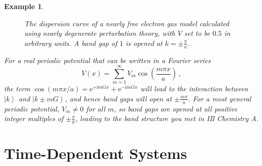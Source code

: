 \documentclass{article}
\theoremstyle{plain}\theoremheaderfont{\normalfont\itshape}\theorembodyfont{\rmfamily}\theoremseparator{.}\newtheorem*{rem}{Remark}\newtheorem*{ex}{Example}\newtheorem*{proof}{Proof}\newtheorem*{altp}{Alternative proof}
\theoremstyle{plain}\theoremheaderfont{\normalfont\bfseries}\theorembodyfont{\rmfamily}\theoremseparator{.}\newtheorem{thm}{Theorem}[section]\newtheorem{lem}[thm]{Lemma}\newtheorem{prop}[thm]{Proposition}\newtheorem*{cor}{Corollary}\newtheorem{defn}[thm]{Definition}\newtheorem{clm}[thm]{Claim}\newtheorem{clminproof}{Claim}
\theoremstyle{break}\theoremheaderfont{\normalfont\itshape}\theorembodyfont{\rmfamily}\theoremseparator{.\medskip}\newtheorem*{proofskip}{Proof}\newtheorem*{exs}{Examples}\newtheorem*{rems}{Remarks}
\theoremstyle{break}\theoremheaderfont{\normalfont\bfseries}\theorembodyfont{\rmfamily}\theoremseparator{.\medskip}\newtheorem{lemskip}[thm]{Lemma}\newtheorem{defnskip}[thm]{Definition}\newtheorem{propskip}[thm]{Proposition}\newtheorem{thmskip}[thm]{Theorem}
\numberwithin{equation}{section}
\newcommand{\ii}{\mathrm{i}}
\newcommand{\ee}{\mathrm{e}}
\newcommand{\ket}[1]{\left| #1 \right\rangle}
\begin{document}
\begin{ex}
        \begin{figure}
            \centering
            
            \caption{The dispersion curve of a nearly free electron gas model calculated using nearly degenerate perturbation theory, with \(V\) set to be \(0.5\) in arbitrary units. A band gap of \(1\) is opened at \(k=\pm\frac{\pi}{a}\).}
        \end{figure}

        For a real periodic potential that can be written in a Fourier series
        \begin{equation}
            V(x)=\sum_{m=1}^{\infty}V_m\cos\left(\frac{m\pi x}{a}\right)\,,
        \end{equation}
        the term \(\cos(m\pi x/a)=\ee^{+\ii mGx}+\ee^{-\ii mGx}\) will lead to the interaction between \(\ket{k}\) and \(\ket{k\pm m G}\), and hence band gaps will open at \(\pm\frac{m\pi}{a}\). For a most general periodic potential, \(V_m\ne 0\) for all \(m\), so band gaps are opened at all positive integer multiples of \(\pm\frac{\pi}{a}\), leading to the band structure you met in IB Chemistry A.
    \end{ex}

    \newpage

    \section{Time-Dependent Systems}\label{Chap:TDPT}
\end{document}
